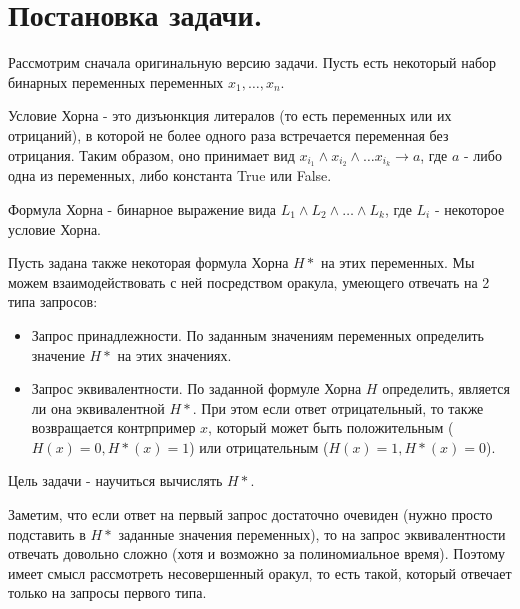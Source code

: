 \section{Постановка задачи.}

Рассмотрим сначала оригинальную версию задачи. Пусть есть некоторый набор бинарных переменных переменных $x_1, \dots, x_n$.

\begin{definition}
	Условие Хорна - это дизъюнкция литералов (то есть переменных или их отрицаний), в которой не более одного раза встречается переменная без отрицания. Таким образом, оно принимает вид $x_{i_1} \land x_{i_2} \land \dots x_{i_k} \rightarrow a$, где $a$ - либо одна из переменных, либо константа True или False.
\end{definition}

\begin{definition}
	Формула Хорна - бинарное выражение вида $L_1 \land L_2 \land \dots \land L_k$, где $L_i$ - некоторое условие Хорна.
\end{definition}

Пусть задана также некоторая формула Хорна $H*$ на этих переменных. Мы можем взаимодействовать с ней посредством оракула, умеющего отвечать на 2 типа запросов:

\begin{itemize}
	\item Запрос принадлежности. По заданным значениям переменных определить значение $H*$ на этих значениях.
	\item Запрос эквивалентности. По заданной формуле Хорна $H$ определить, является ли она эквивалентной $H*$. При этом если ответ отрицательный, то также возвращается контрпример $x$, который может быть положительным ($H(x) = 0, H*(x) = 1$) или отрицательным ($H(x) = 1, H*(x) = 0$).
\end{itemize}

Цель задачи - научиться вычислять $H*$.

Заметим, что если ответ на первый запрос достаточно очевиден (нужно просто подставить в $H*$ заданные значения переменных), то на запрос эквивалентности отвечать довольно сложно (хотя и возможно за полиномиальное время). Поэтому имеет смысл рассмотреть несовершенный оракул, то есть такой, который отвечает только на запросы первого типа.